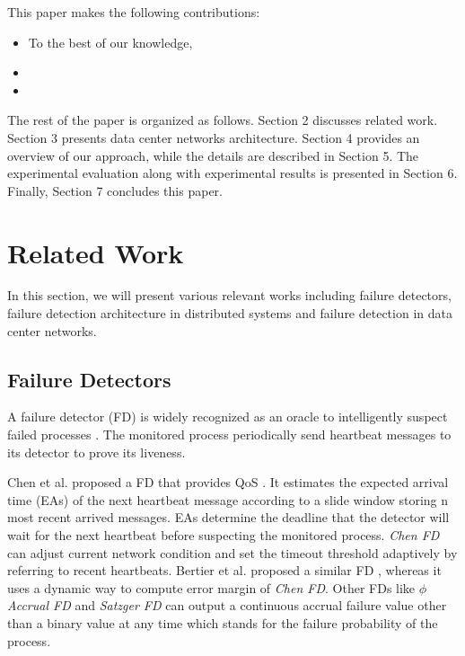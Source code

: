 \documentclass{sig-alternate-05-2015}
\begin{document}
This paper makes the following contributions:
\begin{itemize}
  \item To the best of our knowledge, 
  \item 
  \item 
\end{itemize}

The rest of the paper is organized as follows. Section 2 discusses related work. Section 3 presents data center networks architecture. Section 4 provides an overview of our approach, while the details are described in Section 5. The experimental evaluation along with experimental results is presented in Section 6. Finally, Section 7 concludes this paper.

\section{Related Work}
In this section, we will present various relevant works including failure detectors, failure detection architecture in distributed systems and failure detection in data center networks.

\subsection{Failure Detectors}
A failure detector (FD) is widely recognized as an oracle to intelligently suspect failed processes \cite{chandra1996unreliable}. The monitored process periodically send heartbeat messages to its detector to prove its liveness.

Chen et al. proposed a FD that provides QoS \cite{chen2002quality}. It estimates the expected arrival time (EAs) of the next heartbeat message according to a slide window storing n most recent arrived messages. EAs determine the deadline that the detector will wait for the next heartbeat before suspecting the monitored process. \textit{Chen FD} can adjust current network condition and set the timeout threshold adaptively by referring to recent heartbeats. Bertier et al. proposed a similar FD \cite{bertier2002implementation}, whereas it uses a dynamic way to compute error margin of \textit{Chen FD}. Other FDs like \textit{$\phi$ Accrual FD} \cite{hayashibara2004varphi} and \textit{Satzger FD} \cite{satzger2007new} can output a continuous accrual failure value other than a binary value at any time which stands for the failure probability of the process.
\end{document}
